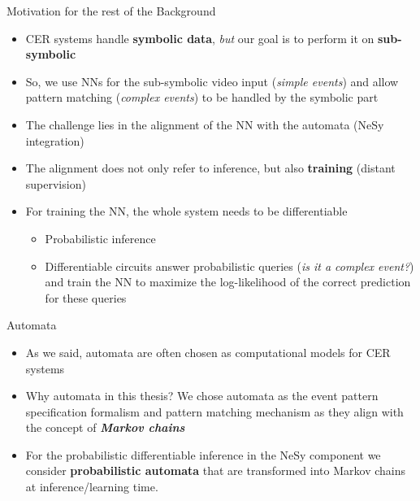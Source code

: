 \documentclass[10pt, aspectratio=169]{beamer}
\begin{document}
\begin{frame}{Motivation for the rest of the Background}
    \begin{itemize}
        \setlength{\itemsep}{12pt}
        \item CER systems handle \textbf{symbolic data}, %
        \textit{but} our goal is to perform it on \textbf{sub-symbolic} %
        \item So, we use NNs for the sub-symbolic video input (\textit{simple events}) and allow pattern matching (\textit{complex events}) to be handled by the symbolic part
        \item The challenge lies in the alignment of the NN with the automata (\textcolor{umBlueLighter}{NeSy integration})
        \item The alignment does not only refer to inference, but also \textbf{training} (distant supervision)
        \item For training the NN, the whole system needs to be differentiable
        \vspace{0.6em}
            \begin{itemize}
            \setlength{\itemsep}{4pt}
                \item {}  Probabilistic inference
                \item {}  Differentiable circuits answer probabilistic queries (\textit{is it a complex event?}) and train the NN to maximize the log-likelihood of the correct prediction for these queries
            \end{itemize}
    \end{itemize}
\end{frame}


\begin{frame}{Automata}
    \begin{itemize}
        \setlength{\itemsep}{12pt}
        \item As we said, automata are often chosen as computational models for CER systems
        \item \textcolor{umBlueLighter}{Why automata in this thesis?} We chose automata as the event pattern specification formalism and pattern matching mechanism as they align with the concept of \textbf{\textit{Markov chains}}
        \item For the probabilistic differentiable inference in the NeSy component we consider \textbf{probabilistic automata} that are transformed into Markov chains at inference/learning time.
    \end{itemize}
\end{frame}
\end{document}
